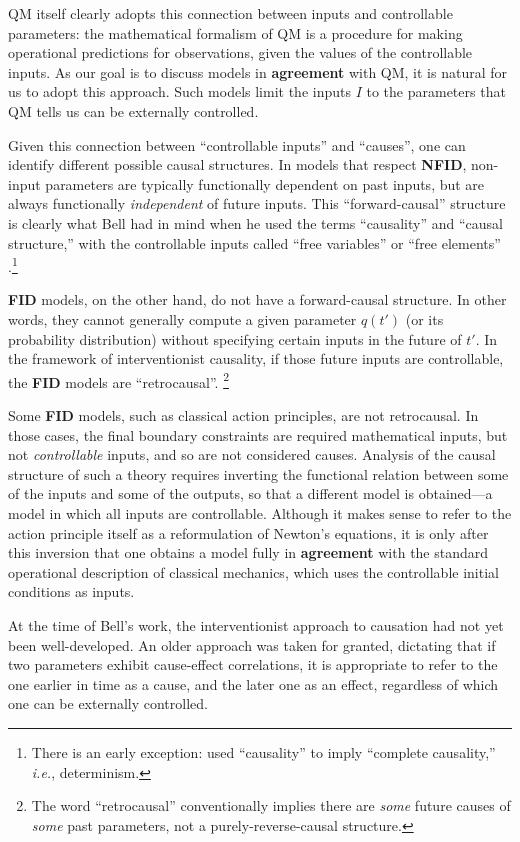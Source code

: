 \documentclass[rmp, aps, preprint, longbibliography]{revtex4-1}
\begin{document}
QM itself clearly adopts this connection between inputs and controllable parameters: the mathematical formalism of QM is a procedure for making operational predictions for observations, given the values of the controllable inputs.  As our goal is to discuss models in {\bf agreement} with QM, it is natural for us to adopt this approach.  Such models limit the inputs $I$ to the parameters that QM tells us can be externally controlled. 

Given this connection between ``controllable inputs'' and ``causes'', one can identify different possible causal structures.  In models that respect {\bf NFID}, non-input parameters are typically functionally dependent on past inputs, but are always functionally \textit{independent} of future inputs. This ``forward-causal'' structure is clearly what Bell had in mind when he used the terms ``causality'' and ``causal structure,'' with the controllable inputs called ``free variables'' or ``free elements'' \cite{bell1977,bell1990}.\footnote{
There is an early exception: \textcite{bell1964} used ``causality'' to imply ``complete causality,'' \emph{i.e.}, determinism.}

{\bf FID} models, on the other hand, do not have a forward-causal structure.  In other words, they cannot generally compute a given parameter $q(t')$ (or its probability distribution) without specifying certain inputs in the future of $t'$.  In the framework of interventionist causality, if those future inputs are controllable, the {\bf FID} models are ``retrocausal''.%
\footnote{The word ``retrocausal'' conventionally implies there are \textit{some} future causes of \textit{some} past parameters, not a purely-reverse-causal structure.}

Some {\bf FID} models, such as classical action principles, are not retrocausal.  In those cases, the final boundary constraints are required mathematical inputs, but not {\em controllable} inputs, and so are not considered causes.  Analysis of the causal structure of such a theory requires inverting the functional relation between some of the inputs and some of the outputs, so that a different model is obtained---a model in which all inputs are controllable.  Although it makes sense to refer to the action principle itself as a reformulation of Newton's equations, it is only after this inversion that one obtains a model fully in {\bf agreement} with the standard operational description of classical mechanics, which uses the controllable initial conditions as inputs.

At the time of Bell's work, the interventionist approach to causation had not yet been well-developed.  An older approach was taken for granted, dictating that if two parameters exhibit cause-effect correlations, it is appropriate to refer to the one earlier in time as a cause, and the later one as an effect, regardless of which one can be externally controlled.
\end{document}
